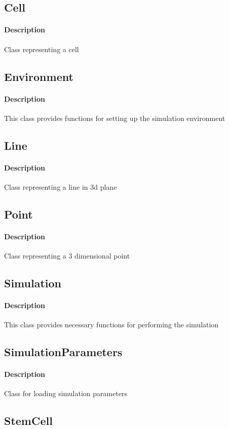 \documentclass[11pt]{report}
\begin{document}
  \subsection{\color{blue}Cell}
  \paragraph{Description}
  Class representing a cell
  \subsection{\color{blue}Environment}
  \paragraph{Description}
  This class provides functions for setting up the simulation environment
  \subsection{\color{blue}Line}
  \paragraph{Description}
  Class representing a line in 3d plane
  \subsection{\color{blue}Point}
  \paragraph{Description}
  Class representing a 3 dimensional point
  \subsection{\color{blue}Simulation}
  \paragraph{Description}
  This class provides necessary functions for performing the simulation
  \subsection{\color{blue}SimulationParameters}
  \paragraph{Description}
  Class for loading simulation parameters
  \subsection{\color{blue}StemCell}
\end{document}
